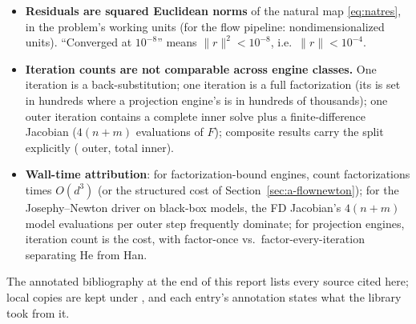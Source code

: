 \begin{itemize}
\item \textbf{Residuals are squared Euclidean norms} of the natural map
  \eqref{eq:natres}, in the problem's working units (for the flow pipeline:
  nondimensionalized units). ``Converged at $10^{-8}$'' means
  $\|r\|^2 < 10^{-8}$, i.e.\ $\|r\| < 10^{-4}$.
\item \textbf{Iteration counts are not comparable across engine classes.}
  One  iteration is a back-substitution; one 
  iteration is a full factorization (its  is set in hundreds
  where a projection engine's is in hundreds of thousands); one
   outer iteration contains a complete inner solve plus a
  finite-difference Jacobian ($4(n+m)$ evaluations of $F$); composite
  results carry the split explicitly ( outer,
   total inner).
\item \textbf{Wall-time attribution}: for factorization-bound engines,
  count factorizations times $O(d^3)$ (or the structured cost of
  Section~\ref{sec:a-flownewton}); for the Josephy--Newton driver on
  black-box models, the FD Jacobian's $4(n+m)$ model evaluations per outer
  step frequently dominate; for projection engines, iteration count is the
  cost, with factor-once vs.\ factor-every-iteration separating He from
  Han.
\end{itemize}

The annotated bibliography at the end of this report lists every source
cited here; local copies are kept under , and each entry's
annotation states what the library took from it.

